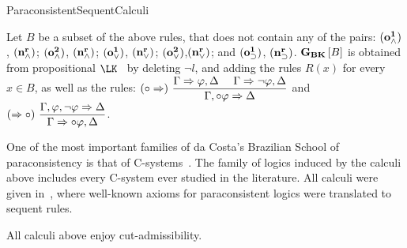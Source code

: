 \begin{entry}{ParaconsistentSequentCalculi}
\begin{clarifications}
  Let $B$ be a subset of the above rules, that does not contain any of the
  pairs:
  ${\bf (o^1_\wedge)}$, ${\bf (n^r_\wedge)}$;
  ${\bf (o^2_\wedge)}$, ${\bf (n^r_\wedge)}$;
  ${\bf (o^1_\vee)}$, ${\bf (n^r_\vee)}$;
  ${\bf (o^2_\vee)}$,${\bf (n^r_\vee)}$; and
  ${\bf (o^1_\supset)}$, ${\bf (n^r_\supset)}$.
  ${{\bf G}_{\bf BK}}\left[B\right]$ is obtained from  propositional
   $\LK$~ by deleting
  $\neg l$,
  and
  adding the rules $R(x)$ for every $x\in B$, as well as the rules:
  \footnotesize
  $(\circ\Rightarrow)~\dfrac{\Gamma\Rightarrow\varphi,\Delta~~~~ \Gamma\Rightarrow\neg\varphi,\Delta}{\Gamma,\circ\varphi\Rightarrow\Delta}$
  \normalsize and 
  \footnotesize
  $(\Rightarrow\circ)~\dfrac{\Gamma,\varphi,\neg\varphi\Rightarrow\Delta}{\Gamma\Rightarrow\circ\varphi,\Delta}$.
\end{clarifications}

\begin{history}
  One of the most important families of da Costa's Brazilian School of
  paraconsistency is that of C-systems~\cite{car:jmar:Taxonomy}.
  The family of logics induced by the calculi above includes every C-system ever
  studied in the literature.
  All calculi were given in~\cite{Avron2015}, where well-known axioms for
  paraconsistent logics were translated to sequent rules.
\end{history}

\begin{technicalities}
  All calculi above enjoy cut-admissibility.
\end{technicalities}


\end{entry}
